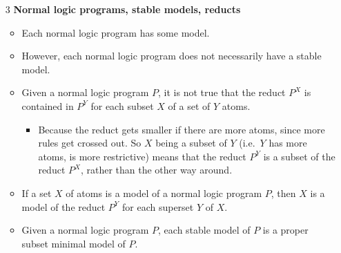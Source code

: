 \documentclass[9pt,a4paper,landscape]{article}
\begin{document}
{\begin{itemize}
	\item[3] \textbf{Normal logic programs, stable models, reducts}
	\begin{itemize}[noitemsep]
		\item Each normal logic program has some model.
		\item However, each normal logic program does not necessarily have a stable model.
		\item Given a normal logic program $P$, it is not true that the reduct $P^X$ is contained in $P^Y$ for each subset $X$ of a set of $Y$ atoms.
		\begin{itemize}[noitemsep]
			\item Because the reduct gets smaller if there are more atoms, since more rules get crossed out. So $X$ being a subset of $Y$ (i.e.\ $Y$ has more atoms, is more restrictive) means that the reduct $P^Y$ is a subset of the reduct $P^X$, rather than the other way around.
		\end{itemize}
		\item If a set $X$ of atoms is a model of a normal logic program $P$, then $X$ is a model of the reduct $P^Y$ for each superset $Y$ of $X$.
		\item Given a normal logic program $P$, each stable model of $P$ is a proper subset minimal model of $P$.
	\end{itemize}
	

\end{itemize}}
\end{document}
